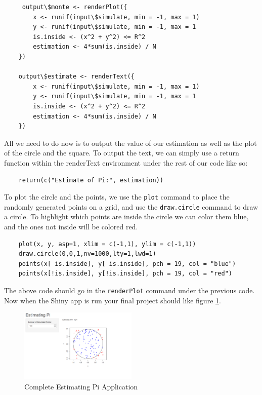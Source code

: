 \begin{lstlisting}
     output\$monte <- renderPlot({
        x <- runif(input\$simulate, min = -1, max = 1)
        y <- runif(input\$simulate, min = -1, max = 1
        is.inside <- (x^2 + y^2) <= R^2
        estimation <- 4*sum(is.inside) / N
    })
    
    output\$estimate <- renderText({
        x <- runif(input\$simulate, min = -1, max = 1)
        y <- runif(input\$simulate, min = -1, max = 1
        is.inside <- (x^2 + y^2) <= R^2
        estimation <- 4*sum(is.inside) / N
    })
\end{lstlisting}

\noindent All we need to do now is to output the value of our estimation as well as the plot of the circle and the square.
To output the text, we can simply use a return function within the renderText environment under the rest of our code like so: 

\begin{lstlisting}
    return(c("Estimate of Pi:", estimation))
\end{lstlisting}
 
\noindent To plot the circle and the points, we use the \texttt{plot} command to place the randomly generated points on a grid, and use the \texttt{draw.circle} command to draw a circle.
To highlight which points are inside the circle we can color them blue, and the ones not inside will be colored red. 

\begin{lstlisting}
    plot(x, y, asp=1, xlim = c(-1,1), ylim = c(-1,1))
    draw.circle(0,0,1,nv=1000,lty=1,lwd=1)
    points(x[ is.inside], y[ is.inside], pch = 19, col = "blue")
    points(x[!is.inside], y[!is.inside], pch = 19, col = "red")
\end{lstlisting}

\noindent The above code should go in the \texttt{renderPlot} command under the previous code.
Now when the Shiny app is run your final project should like figure \ref{fig:Complete}. 

\begin{figure}[htbp!]
   \centering
   \includegraphics[width=0.5\textwidth]{pictures/pi/estimate.PNG} 
   \caption{Complete Estimating Pi Application}
   \label{fig:Complete}
\end{figure}

